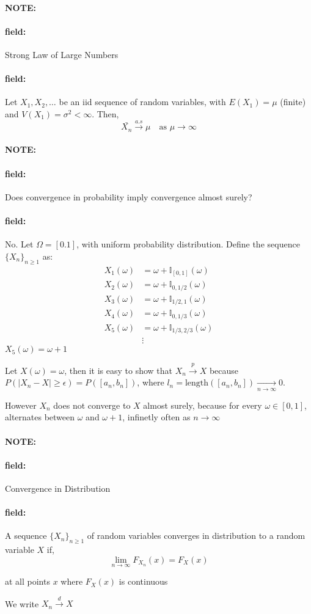 \documentclass[12pt]{article}
\newenvironment{note}{\paragraph{NOTE:}}{}
\newenvironment{field}{\paragraph{field:}}{}
\begin{document}
\begin{note}
  \begin{field}
    Strong Law of Large Numbers
  \end{field}
  \begin{field}
    Let $X_1, X_2, \ldots$ be an iid sequence of random variables, with $E(X_1) = \mu$ (finite) and $V(X_1) = \sigma^2 < \infty$. Then,
    $$\bar{X_n} \overset{a.s}{\to} \mu \quad \text{as } \mu \to \infty$$
  \end{field}
\end{note}

\begin{note}
  \begin{field}
    Does convergence in probability imply convergence almost surely?
  \end{field}
  \begin{field}
    No.
    Let $\Omega = [0.1]$, with uniform probability distribution.  Define the sequence $\{X_n\}_{n \geq 1}$ as:
    \begin{align*}
      X_1(\omega) &= \omega + \mathbb{I}_{[0,1]}(\omega)\\
      X_2(\omega) &= \omega + \mathbb{I}_{0,1/2}(\omega)\\
      X_3(\omega) &= \omega + \mathbb{I}_{1/2,1}(\omega)\\
      X_4(\omega) &= \omega + \mathbb{I}_{0,1/3}(\omega)\\
      X_5(\omega) &= \omega + \mathbb{I}_{1/3,2/3}(\omega)\\
      &\vdots
    \end{align*}
    $X_5(\omega) = \omega + 1$

    Let $X(\omega) = \omega$, then it is easy to show that $X_n \overset{p}{\to} X$ because $P(|X_n - X| \geq \epsilon) = P([a_n,b_n])$, where $l_n = \text{length}([a_n, b_n]) \underset{n \to \infty}{\to} 0$.

    However $X_n$ does not converge to $X$ almost surely, because for every $\omega \in [0,1]$, alternates between $\omega$ and $\omega + 1$, infinetly often as $n \to \infty$
  \end{field}
\end{note}



\begin{note}
  \begin{field}
    Convergence in Distribution
  \end{field}
  \begin{field}
    A sequence $\{X_n\}_{n \geq 1}$ of random variables converges in distribution to a random variable $X$ if,
    $$ \lim_{n \to \infty} F_{X_n}(x) = F_X(x)$$

    at all points $x$ where $F_X(x)$ is continuous

    We write $X_n \overset{d}{\to} X$
  \end{field}
\end{note}
\end{document}
